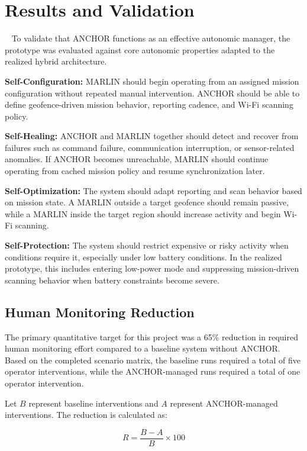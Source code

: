 \documentclass[journal]{IEEEtran}
\begin{document}
\section{Results and Validation}~\label{results}
To validate that ANCHOR functions as an effective autonomic manager, the prototype was evaluated against core autonomic properties adapted to the realized hybrid architecture.

\textbf{Self-Configuration:} MARLIN should begin operating from an assigned mission configuration without repeated manual intervention. ANCHOR should be able to define geofence-driven mission behavior, reporting cadence, and Wi-Fi scanning policy.

\textbf{Self-Healing:} ANCHOR and MARLIN together should detect and recover from failures such as command failure, communication interruption, or sensor-related anomalies. If ANCHOR becomes unreachable, MARLIN should continue operating from cached mission policy and resume synchronization later.

\textbf{Self-Optimization:} The system should adapt reporting and scan behavior based on mission state. A MARLIN outside a target geofence should remain passive, while a MARLIN inside the target region should increase activity and begin Wi-Fi scanning.

\textbf{Self-Protection:} The system should restrict expensive or risky activity when conditions require it, especially under low battery conditions. In the realized prototype, this includes entering low-power mode and suppressing mission-driven scanning behavior when battery constraints become severe.

\subsection{Human Monitoring Reduction}
The primary quantitative target for this project was a 65\% reduction in required human monitoring effort compared to a baseline system without ANCHOR. Based on the completed scenario matrix, the baseline runs required a total of five operator interventions, while the ANCHOR-managed runs required a total of one operator intervention.

Let $B$ represent baseline interventions and $A$ represent ANCHOR-managed interventions. The reduction is calculated as:

\begin{equation}
    R = \frac{B - A}{B} \times 100
\end{equation}
\end{document}
